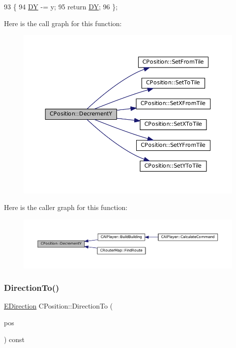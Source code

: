 \begin{DoxyCode}
93                              \{
94             \hyperlink{classCPosition_a84139c9e8eb547e7cf3cb851739943a4}{DY} -= y; 
95             \textcolor{keywordflow}{return} \hyperlink{classCPosition_a84139c9e8eb547e7cf3cb851739943a4}{DY};
96         \};
\end{DoxyCode}
Here is the call graph for this function\+:\nopagebreak
\begin{figure}[H]
\begin{center}
\leavevmode
\includegraphics[width=350pt]{classCPosition_a51ee44d9e0457d6277567fd8a66fdec7_cgraph}
\end{center}
\end{figure}
Here is the caller graph for this function\+:\nopagebreak
\begin{figure}[H]
\begin{center}
\leavevmode
\includegraphics[width=350pt]{classCPosition_a51ee44d9e0457d6277567fd8a66fdec7_icgraph}
\end{center}
\end{figure}
\hypertarget{classCPosition_a65124e3543c2d2e284e5eb517cd7f842}{}\label{classCPosition_a65124e3543c2d2e284e5eb517cd7f842} 
\subsubsection{\texorpdfstring{Direction\+To()}{DirectionTo()}}
{\footnotesize\ttfamily \hyperlink{GameDataTypes_8h_acb2b033915f6659a71a38b5aa6e4eb42}{E\+Direction} C\+Position\+::\+Direction\+To (\begin{DoxyParamCaption}\item[{const \hyperlink{classCPosition}{C\+Position} \&}]{pos }\end{DoxyParamCaption}) const}



